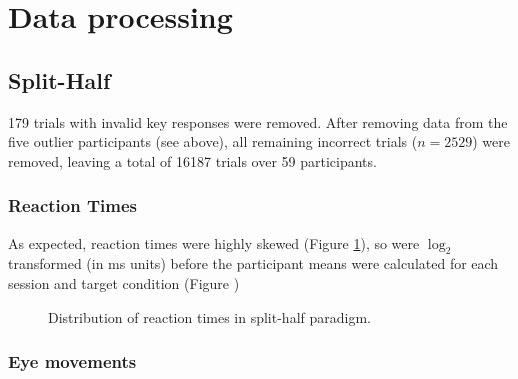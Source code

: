 \documentclass[a4paper, oneside, 11pt, onecolumn]{article}
\begin{document}
\section{Data processing}

\subsection{Split-Half}

179 trials with invalid key responses were removed. After removing data from the five outlier participants (see above), all remaining incorrect trials ($n=2529$) were removed, leaving a total of 16187 trials over 59 participants.

\subsubsection{Reaction Times}
As expected, reaction times were highly skewed (Figure \ref{fig:splithalf_rt_dists_all}), so were $\log_2$ transformed (in ms units) before the participant means were calculated for each session and target condition (Figure )

\begin{figure}
\centering
{}
\caption{Distribution of reaction times in split-half paradigm.}
\label{fig:splithalf_rt_dists_all}
\end{figure}

\subsubsection{Eye movements}
\end{document}
